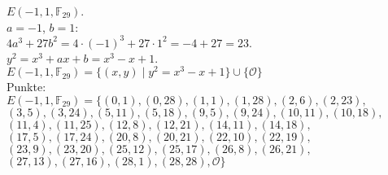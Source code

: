 \documentclass[a4paper, 10pt]{scrartcl}
\begin{document}
$E(-1, 1, \mathbb{F}_{29})$.\\

$a = -1$, $b = 1$:\\
$4a^{3} + 27b^{2} = 4\cdot (-1)^{3} + 27\cdot 1^{2} = -4 + 27 = 23.$\\
$y^{2} = x^{3} + ax + b = x^{3} - x + 1$.\\

$E(-1, 1, \mathbb{F}_{29}) = \{ (x, y)\mid y^{2} = x^{3} - x + 1\}\cup \{ \mathcal{O} \}$\\

Punkte:\\
$
E(-1, 1, \mathbb{F}_{29}) = \{
(0, 1),
(0, 28),
(1, 1),
(1, 28),
(2, 6),
(2, 23),
$\\
$
(3, 5),
(3, 24),
(5, 11),
(5, 18),
(9, 5),
(9, 24),
(10, 11),
(10, 18),
$\\
$
(11, 4),
(11, 25),
(12, 8),
(12, 21),
(14, 11),
(14, 18),
$\\
$
(17, 5),
(17, 24),
(20, 8),
(20, 21),
(22, 10),
(22, 19),
$\\
$
(23, 9),
(23, 20),
(25, 12),
(25, 17),
(26, 8),
(26, 21),
$\\
$
(27, 13),
(27, 16),
(28, 1),
(28, 28),
\mathcal{O} \}
$\\
\end{document}
